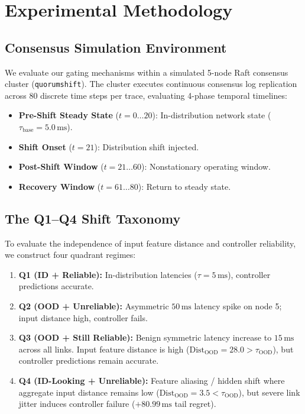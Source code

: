 \section{Experimental Methodology}
\label{sec:methodology}

\subsection{Consensus Simulation Environment}
We evaluate our gating mechanisms within a simulated 5-node Raft consensus cluster (\texttt{quorumshift}). The cluster executes continuous consensus log replication across 80 discrete time steps per trace, evaluating 4-phase temporal timelines:
\begin{itemize}
    \item \textbf{Pre-Shift Steady State} ($t = 0 \dots 20$): In-distribution network state ($\tau_{\text{base}} = 5.0\,\text{ms}$).
    \item \textbf{Shift Onset} ($t = 21$): Distribution shift injected.
    \item \textbf{Post-Shift Window} ($t = 21 \dots 60$): Nonstationary operating window.
    \item \textbf{Recovery Window} ($t = 61 \dots 80$): Return to steady state.
\end{itemize}

\subsection{The Q1--Q4 Shift Taxonomy}
To evaluate the independence of input feature distance and controller reliability, we construct four quadrant regimes:
\begin{enumerate}
    \item \textbf{Q1 (ID + Reliable):} In-distribution latencies ($\tau = 5\,\text{ms}$), controller predictions accurate.
    \item \textbf{Q2 (OOD + Unreliable):} Asymmetric $50\,\text{ms}$ latency spike on node 5; input distance high, controller fails.
    \item \textbf{Q3 (OOD + Still Reliable):} Benign symmetric latency increase to $15\,\text{ms}$ across all links. Input feature distance is high ($\text{Dist}_{\text{OOD}} = 28.0 > \tau_{\text{OOD}}$), but controller predictions remain accurate.
    \item \textbf{Q4 (ID-Looking + Unreliable):} Feature aliasing / hidden shift where aggregate input distance remains low ($\text{Dist}_{\text{OOD}} = 3.5 < \tau_{\text{OOD}}$), but severe link jitter induces controller failure ($+80.99\,\text{ms}$ tail regret).
\end{enumerate}

